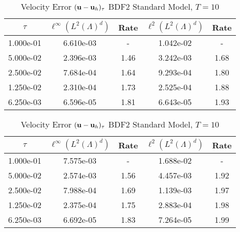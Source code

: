 \documentclass[letterpaper]{erdc}
\begin{document}
\begin{table}[h!]
  \parbox{.45\linewidth}{
  \tiny
  \centering
    \caption{Velocity Error $(\textbf{u} - \textbf{u}_h)_{\tau}$ BDF2 Rotational Model, $T=10$}
    \begin{tabular}{c|c|c|c|c}
      $\tau$ &  $\ell^{\infty}\left(L^2(\Lambda)^d\right)$ &  Rate  &  $\ell^2\left(L^2(\Lambda)^d\right)$  &  Rate\\
      \hline
      1.000e-01 & 6.610e-03 &  -   & 1.042e-02 &  -  \\
      5.000e-02 & 2.396e-03 & 1.46 & 3.242e-03 & 1.68\\
      2.500e-02 & 7.684e-04 & 1.64 & 9.293e-04 & 1.80\\
      1.250e-02 & 2.310e-04 & 1.73 & 2.525e-04 & 1.88\\
      6.250e-03 & 6.596e-05 & 1.81 & 6.643e-05 & 1.93
    \end{tabular}
    }
    \hfill
    \parbox{.45\linewidth}{
    \tiny
    \centering
      \caption{Velocity Error $(\textbf{u} - \textbf{u}_h)_{\tau}$ BDF2 Standard Model, $T=10$}
      \begin{tabular}{c|c|c|c|c}
        $\tau$ &  $\ell^{\infty}\left(L^2(\Lambda)^d\right)$ &  Rate  &  $\ell^2\left(L^2(\Lambda)^d\right)$  &  Rate\\
        \hline
        1.000e-01 & 7.575e-03 &   -  & 1.688e-02 &   - \\
        5.000e-02 & 2.574e-03 & 1.56 & 4.457e-03 & 1.92\\
        2.500e-02 & 7.988e-04 & 1.69 & 1.139e-03 & 1.97\\
        1.250e-02 & 2.375e-04 & 1.75 & 2.883e-04 & 1.98\\
        6.250e-03 & 6.692e-05 & 1.83 & 7.264e-05 & 1.99
      \end{tabular}
    }
\end{table}
\end{document}

